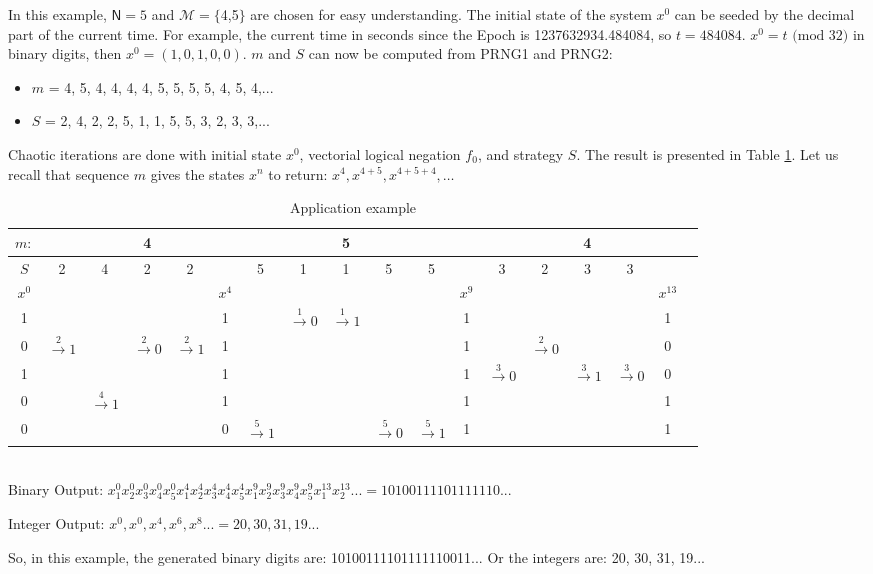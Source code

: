 In this example, $\mathsf{N} = 5$ and $\mathcal{M} = \{$4,5$\}$ are chosen for easy understanding.
The initial state of the system $x^0$ can be seeded by the decimal part of the current time. For example, the current time in seconds since the Epoch is 1237632934.484084, so $t = 484084$. $x^0 = t \text{ (mod 32)}$ in binary digits, then $x^0 = (1, 0, 1, 0, 0)$. $m$ and $S$ can now be computed from PRNG1 and PRNG2:
\begin{itemize}
\item $m$ = 4, 5, 4, 4, 4, 4, 5, 5, 5, 5, 4, 5, 4,...
\item $S$ = 2, 4, 2, 2, 5, 1, 1, 5, 5, 3, 2, 3, 3,...
\end{itemize}
Chaotic iterations are done with initial state $x^0$, vectorial logical negation $f_0$, and strategy $S$. The result is presented in Table \ref{table application example}. Let us recall that sequence $m$ gives the states $x^n$ to return: $x^4, x^{4+5}, x^{4+5+4}, \hdots$\newline
\begin{table}
\centering
\begin{tabular}{c|c@{}c@{}c@{}c@{}c|c@{}c@{}c@{}c@{}c@{}c|c@{}c@{}c@{}c@{}c@{}c}
\hline\hline
$m:$ & & & 4 & & & & & 5 & & & & & & 4 & & & \\ \hline
$S$ & 2 & 4 & 2 & 2 & & 5 & 1 & 1 & 5 & 5 & & 3 & 2 & 3 & 3 & & \\ \hline
$x^{0}$ & & & & & $x^{4}$ & & & & & & $x^{9}$ & & & & & $x^{13}$ & \\
1 & & & & &
1 & & $\xrightarrow{1} 0$ & $\xrightarrow{1} 1$ & & &
1 & & & & &
1 & \\
0 & $\xrightarrow{2} 1$ & & $\xrightarrow{2} 0$ & $\xrightarrow{2} 1$ &
1 & & & & & &
1 & & $\xrightarrow{2} 0$ & & & 0 &\\
1 & & & & &
1 & & & & & &
1 & $\xrightarrow{3} 0$ & & $\xrightarrow{3} 1$ & $\xrightarrow{3} 0$ &
0 &\\
0 & & $\xrightarrow{4} 1$ & & &
1 & & & & & &
1 & & & & &
1 &\\
0 & & & & &
0 & $\xrightarrow{5} 1$ & & & $\xrightarrow{5} 0$ & $\xrightarrow{5} 1$ &
1 & & & & &
1 &\\
\hline\hline
\end{tabular}\\
\vspace{0.5cm}
Binary Output: $x_1^{0}x_2^{0}x_3^{0}x_4^{0}x_5^{0}x_1^{4}x_2^{4}x_3^{4}x_4^{4}x_5^{4}x_1^{9}x_2^{9}x_3^{9}x_4^{9}x_5^{9}x_1^{13}x_2^{13}... = 10100111101111110...$

Integer Output:
$x^{0},x^{0},x^{4},x^{6},x^{8}... = 20,30,31,19...$
\caption{Application example}
\label{table application example}
\end{table}
So, in this example, the generated binary digits are: 10100111101111110011... Or the integers are: 20, 30, 31, 19...

